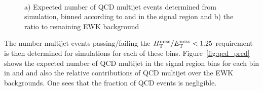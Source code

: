 \begin{figure}[!h]
  \centering
   \\
  \caption{a) Expected number of QCD multijet events determined from
    simulation, binned according to \njet and \scalht in the signal region and b) the ratio to remaining EWK background }
  \label{fig:qcd_plots}
\end{figure}


The number multijet events passing/failing the $\mbox{$\mbox{$H_{\rm T}^{\rm miss}$} / \mbox{$E_\text{T}^{\rm miss}$}$} < 1.25$ requirement is then determined for simulations for each
of these bins. Figure~\ref{fig:qcd_pred} shows the expected number of QCD multijet  in the signal region bins for each bin in \njet and \scalht and also the relative contributions of QCD multijet over the EWK backgrounds. One sees that the fraction of QCD events is negligible.

